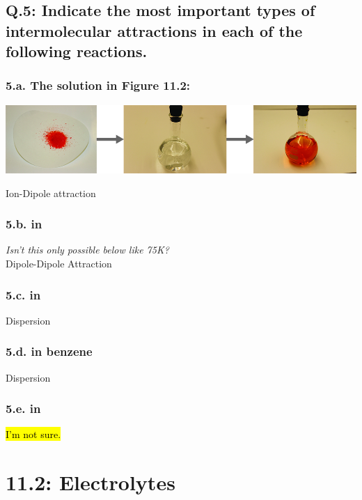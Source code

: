 \documentclass[10pt, letterpaper]{article}
\begin{document}

\subsection*{Q.5: Indicate the most important types of 
intermolecular attractions in each of the following reactions.}

\subsubsection*{5.a. The solution in Figure 11.2:}
\includegraphics[width=\textwidth]{figure_11_2}
\begin{center}
	\large
	\textbf{%
	}
\end{center}
Ion-Dipole attraction

\subsubsection*{5.b.\@ {} in }
\textit{Isn't this only possible below like 75K?}
\\
Dipole-Dipole Attraction

\subsubsection*{5.c.\@ {} in }
Dispersion

\subsubsection*{5.d.\@ {} in benzene }
Dispersion
\subsubsection*{5.e.\@ {} in }
\hl{I'm not sure.}

\section*{11.2: Electrolytes}
\end{document}
